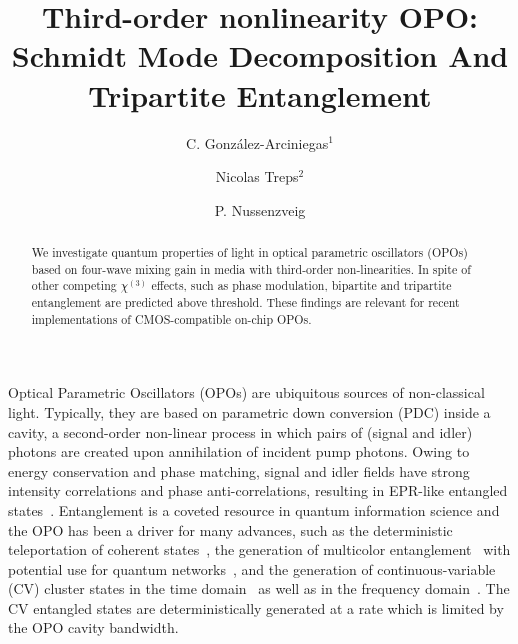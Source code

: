 \documentclass[aps,prl,twocolumn,groupedaddress]{revtex4-1}
\begin{document}
\title{Third-order nonlinearity OPO: Schmidt Mode Decomposition And Tripartite Entanglement}

\author{C. Gonz\'alez-Arciniegas$^{1}$}
\author{Nicolas Treps$^{2}$}
\author{P. Nussenzveig}

\begin{abstract}

We investigate quantum properties of light in optical parametric oscillators (OPOs) based on four-wave mixing gain in media with third-order non-linearities. In spite of other competing $\chi^{(3)}$ effects, such as phase modulation, bipartite and tripartite entanglement are predicted above threshold. These findings are relevant for recent implementations of CMOS-compatible on-chip OPOs.
\end{abstract}

\maketitle

Optical Parametric Oscillators (OPOs) are ubiquitous sources of non-classical light. Typically, they are based on parametric down conversion (PDC) inside a cavity, a second-order non-linear process in which pairs of (signal and idler) photons are created upon annihilation of incident pump photons. Owing to energy conservation and phase matching, signal and idler fields have strong intensity correlations and phase anti-correlations, resulting in EPR-like entangled states~\cite{Reid1988}. Entanglement is a coveted resource in quantum information science and the OPO has been a driver for many advances, such as the deterministic teleportation of coherent states~\cite{Furusawa1998}, the generation of multicolor entanglement~\cite{Coelho2009,Barbosa2010} with potential use for quantum networks~\cite{Kimble2008}, and the generation of continuous-variable (CV) cluster states in the time domain~\cite{Yokoyama2013} as well as in the frequency domain~\cite{Roslund2013}. The CV entangled states are deterministically generated at a rate which is limited by the OPO cavity bandwidth. 
\end{document}
